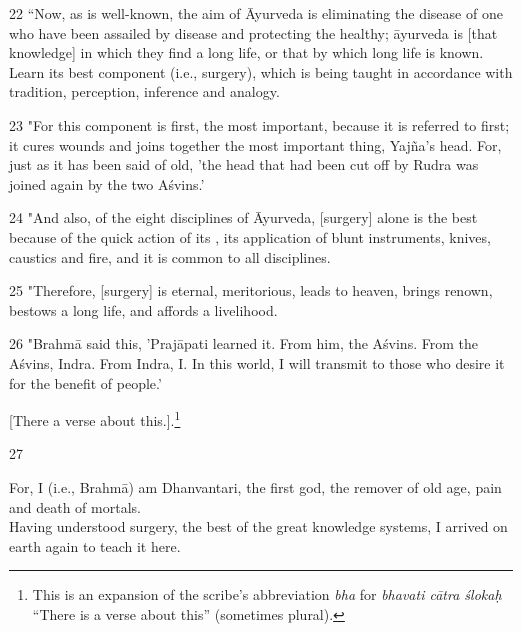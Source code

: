 \documentclass[12pt]{article}
\let\se\saneng  %
\begin{document}
\begin{translation}
        \item[22] “Now, as is well-known, the aim of Āyurveda is eliminating the 
        disease of one who have been assailed by disease and protecting the healthy;  
        āyurveda is [that knowledge] in which they find a long life, or that by which 
        long life is known. Learn its best component (i.e., surgery), which is being 
        taught in accordance with tradition, perception, inference and analogy.
        
        \item[23] "For this component is first, the most important, because it is 
        referred to first; it cures wounds and joins together the most important thing, 
        Yajña's head. For, just as it has been said of old, 'the head that had been cut off 
        by Rudra was joined again by the two Aśvins.'
        
        \item[24] "And also, of the eight disciplines of Āyurveda, [surgery] alone is 
        the best because of the quick action of its \se{kriyā}{procedures}, its 
        application of blunt 
        instruments, knives, caustics and fire, and it is common to all disciplines.
        
        \item[25] "Therefore, [surgery] is eternal, meritorious, leads to heaven, 
        brings renown, bestows a long life, and affords a livelihood.
        
        \item[26] "Brahmā said this, 'Prajāpati learned it. From him, the Aśvins. From 
        the Aśvins, 
        Indra. From Indra, I. In this world, I will transmit to those who desire it for the benefit of 
        people.' 
        
        [There a verse about this.].\footnote{This is an expansion 
        of the scribe's abbreviation \emph{bha} for \emph{bhavati cātra ślokaḥ} 
        “There is a verse about this” (sometimes plural).\label{bha}}
        
        \item[27]           
        \begin{sloka}
            For, I (i.e., Brahmā) am Dhanvantari, the first god, the remover of old age, 
            pain and 
            death of mortals.\\ Having understood surgery, the best of the great 
            knowledge 
            systems, I arrived on earth again to teach it here.
        \end{sloka}    
        

\end{translation}
\end{document}
